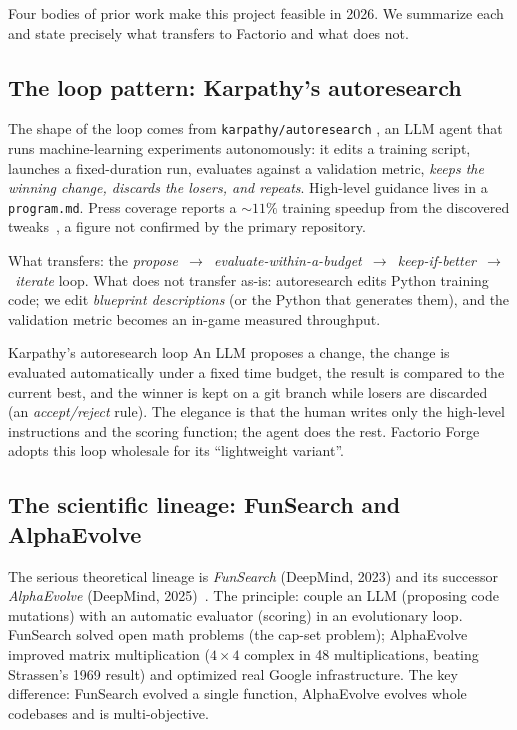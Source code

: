 \documentclass[11pt,a4paper]{article}
\begin{document}
Four bodies of prior work make this project feasible in 2026. We summarize each
and state precisely what transfers to Factorio and what does not.

\subsection{The loop pattern: Karpathy's autoresearch}

The shape of the loop comes from \texttt{karpathy/autoresearch}
\cite{karpathy_autoresearch}, an LLM agent that runs machine-learning experiments
autonomously: it edits a training script, launches a fixed-duration run,
evaluates against a validation metric, \emph{keeps the winning change, discards
the losers, and repeats}. High-level guidance lives in a \texttt{program.md}.
Press coverage reports a ${\sim}11\%$ training speedup from the discovered
tweaks~\cite{fortune_karpathy}, a figure not confirmed by the primary
repository.

What transfers: the \emph{propose~$\rightarrow$~evaluate-within-a-budget~$\rightarrow$~keep-if-better~$\rightarrow$~iterate}
loop. What does not transfer as-is: autoresearch edits Python training code; we
edit \emph{blueprint descriptions} (or the Python that generates them), and the
validation metric becomes an in-game measured throughput.

\begin{notionbox}{Karpathy's autoresearch loop}
An LLM proposes a change, the change is evaluated automatically under a fixed
time budget, the result is compared to the current best, and the winner is kept
on a git branch while losers are discarded (an \emph{accept/reject} rule). The
elegance is that the human writes only the high-level instructions and the
scoring function; the agent does the rest. Factorio Forge adopts this loop
wholesale for its ``lightweight variant''.
\end{notionbox}

\subsection{The scientific lineage: FunSearch and AlphaEvolve}

The serious theoretical lineage is \emph{FunSearch} (DeepMind, 2023) and its
successor \emph{AlphaEvolve} (DeepMind, 2025)~\cite{alphaevolve_report,alphaevolve_arxiv}.
The principle: couple an LLM (proposing code mutations) with an automatic
evaluator (scoring) in an evolutionary loop. FunSearch solved open math problems
(the cap-set problem); AlphaEvolve improved matrix multiplication
($4\times4$ complex in 48 multiplications, beating Strassen's 1969 result) and
optimized real Google infrastructure. The key difference: FunSearch evolved a
single function, AlphaEvolve evolves whole codebases and is multi-objective.
\end{document}
